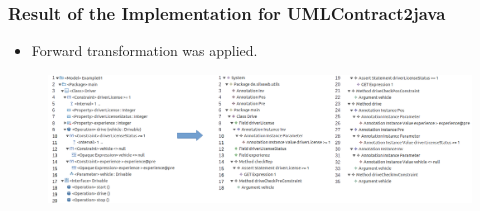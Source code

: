 \documentclass{beamer}
\begin{document}
\begin{frame}[t]
	\frametitle{Result of the Implementation for UMLContract2java}	
	\begin{itemize}
		\item Forward transformation was applied.
	\end{itemize}
	\begin{figure}
		\includegraphics[width=\textwidth]{umlContracts2java_Example01}
	\end{figure}
\end{frame}
\end{document}
